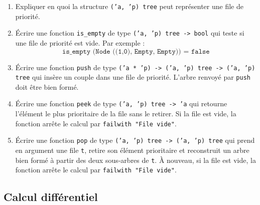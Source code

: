 \documentclass{article}
\begin{document}
{    \begin{enumerate}
        \item Expliquer en quoi la structure \texttt{('a, 'p) tree} peut représenter une file de priorité.
        \item Écrire une fonction \texttt{is\_empty} de type \texttt{('a, 'p) tree -> bool} qui teste si une file de priorité est vide. Par exemple :
        \[
        \texttt{is\_empty (Node ((1,0), Empty, Empty)) = false}
        \]
        \item Écrire une fonction \texttt{push} de type \texttt{('a * 'p) -> ('a, 'p) tree -> ('a, 'p) tree} qui insère un couple dans une file de priorité. L'arbre renvoyé par \texttt{push} doit être bien formé.
        \item Écrire une fonction \texttt{peek} de type \texttt{('a, 'p) tree -> 'a} qui retourne l'élément le plus prioritaire de la file sans le retirer. Si la file est vide, la fonction arrête le calcul par \texttt{failwith "File vide"}.
        \item Écrire une fonction \texttt{pop} de type \texttt{('a, 'p) tree -> ('a, 'p) tree} qui prend en argument une file \texttt{t}, retire son élément prioritaire et reconstruit un arbre bien formé à partir des deux sous-arbres de \texttt{t}. À nouveau, si la file est vide, la fonction arrête le calcul par \texttt{failwith "File vide"}.
    \end{enumerate}
}
\subsection{Calcul différentiel}



\end{document}
